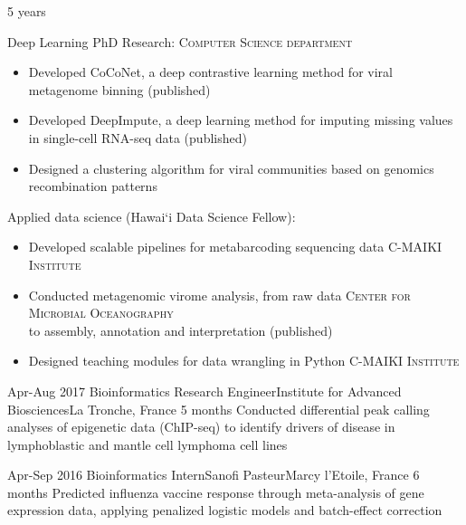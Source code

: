 \begin{experiences}
{5 years} {
Deep Learning PhD Research: \hfill \textsc{Computer Science department}
\begin{itemize}
    \item Developed CoCoNet, a deep contrastive learning method for viral metagenome binning (published)
    {}
    \item Developed DeepImpute, a deep learning method for imputing missing values in single-cell RNA-seq data (published)\\
    {}
    \item Designed a clustering algorithm for viral communities based on genomics recombination patterns \\
    {}
\end{itemize}

Applied data science (Hawai`i Data Science Fellow):
\begin{itemize}
    \item Developed scalable pipelines for metabarcoding sequencing data
    \hfill\textsc{C-MAIKI Institute}\\
    {}
    \item Conducted metagenomic virome analysis, from raw data \hfill \textsc{Center for Microbial Oceanography} \\
    to assembly, annotation and interpretation (published)
    \item Designed teaching modules for data wrangling in Python \hfill \textsc{C-MAIKI Institute}
\end{itemize}
}{}


\experience
{Apr-Aug 2017}   {Bioinformatics Research Engineer}{Institute for Advanced Biosciences}{La Tronche, France}
{5 months} {Conducted differential peak calling analyses of epigenetic data (ChIP-seq) to identify drivers of disease in lymphoblastic and mantle cell lymphoma cell lines
}{}
  
\experience
{Apr-Sep 2016}   {Bioinformatics Intern}{Sanofi Pasteur}{Marcy l'Etoile, France}
{6 months} {Predicted influenza vaccine response through meta-analysis of gene expression data, applying penalized logistic models and batch-effect correction
}{}

\end{experiences}
